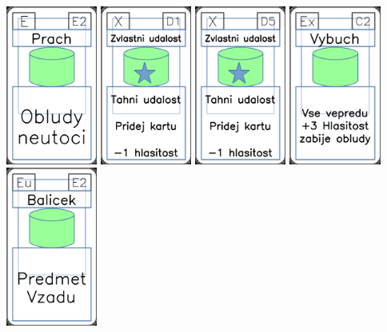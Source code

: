 \documentclass[a4paper]{article}
\begin{document}
	\includegraphics[width=3.0cm]{img-4_51}
	\includegraphics[width=3.0cm]{img-5_15}
	\includegraphics[width=3.0cm]{img-5_19}
	\includegraphics[width=3.0cm]{img-4_11}
	\includegraphics[width=3.0cm]{img-4_21}
\end{document}
